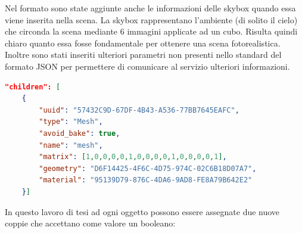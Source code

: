 Nel formato sono state aggiunte anche le informazioni delle skybox quando essa viene inserita nella scena. La skybox rappresentano l’ambiente (di solito il cielo) che circonda la scena mediante 6 immagini applicate ad un cubo. Risulta quindi chiaro quanto essa fosse fondamentale per ottenere una scena fotorealistica.
Inoltre sono stati inseriti ulteriori parametri non presenti nello standard del formato JSON per permettere di comunicare al servizio ulteriori informazioni.

\begin{lstlisting}[language=json]
"children": [
    {
        "uuid": "57432C9D-67DF-4B43-A536-77BB7645EAFC",
        "type": "Mesh",
        "avoid_bake": true,
        "name": "mesh",
        "matrix": [1,0,0,0,0,1,0,0,0,0,1,0,0,0,0,1],
        "geometry": "D6F14425-4F6C-4D75-974C-02C6B18D07A7",
        "material": "95139D79-876C-4DA6-9AD8-FE8A79B642E2"
    }]
\end{lstlisting}
In questo lavoro di tesi ad ogni oggetto possono essere assegnate due nuove coppie che accettano come valore un booleano:

